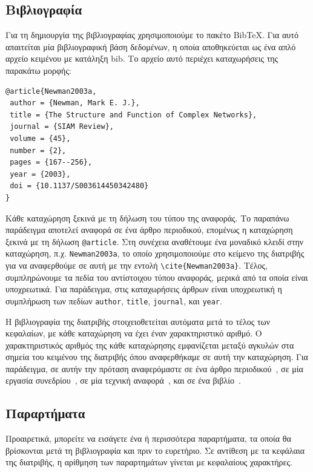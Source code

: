 \subsection{Βιβλιογραφία}
\label{subsec:Bibliography}

Για τη δημιουργία της βιβλιογραφίας χρησιμοποιούμε το πακέτο BibTeX.
Για αυτό απαιτείται μία βιβλιογραφική βάση δεδομένων, η οποία αποθηκεύεται ως ένα απλό αρχείο κειμένου με κατάληξη bib.
Το αρχείο αυτό περιέχει καταχωρήσεις της παρακάτω μορφής:

\begin{verbatim}
@article{Newman2003a,
 author = {Newman, Mark E. J.},
 title = {The Structure and Function of Complex Networks},
 journal = {SIAM Review},
 volume = {45},
 number = {2},
 pages = {167--256},
 year = {2003},
 doi = {10.1137/S003614450342480}
}
\end{verbatim}

Κάθε καταχώρηση ξεκινά με τη δήλωση του τύπου της αναφοράς.
Το παραπάνω παράδειγμα αποτελεί αναφορά σε ένα άρθρο περιοδικού, επομένως η καταχώρηση ξεκινά με τη δήλωση \verb|@article|.
Στη συνέχεια αναθέτουμε ένα μοναδικό κλειδί στην καταχώρηση, π.χ. \verb|Newman2003a|, το οποίο χρησιμοποιούμε στο κείμενο της διατριβής για να αναφερθούμε σε αυτή με την εντολή \verb|\cite{Newman2003a}|.
Τέλος, συμπληρώνουμε τα πεδία του αντίστοιχου τύπου αναφοράς, μερικά από τα οποία είναι υποχρεωτικά.
Για παράδειγμα, στις καταχωρήσεις άρθρων είναι υποχρεωτική η συμπλήρωση των πεδίων \verb|author|, \verb|title|, \verb|journal|, και \verb|year|.

Η βιβλιογραφία της διατριβής στοιχειοθετείται αυτόματα μετά το τέλος των κεφαλαίων, με κάθε καταχώρηση να έχει έναν χαρακτηριστικό αριθμό.
Ο χαρακτηριστικός αριθμός της κάθε καταχώρησης εμφανίζεται μεταξύ αγκυλών στα σημεία του κειμένου της διατριβής όπου αναφερθήκαμε σε αυτή την καταχώρηση.
Για παράδειγμα, σε αυτήν την πρόταση αναφερόμαστε σε ένα άρθρο περιοδικού~\cite{Newman2003a}, σε μία εργασία συνεδρίου~\cite{DeCandia2007a}, σε μία τεχνική αναφορά~\cite{Jain1984a}, και σε ένα βιβλίο~\cite{Golumbic2004a}.

\subsection{Παραρτήματα}
\label{subsec:Appendices}

Προαιρετικά, μπορείτε να εισάγετε ένα ή περισσότερα παραρτήματα, τα οποία θα βρίσκονται μετά τη βιβλιογραφία και πριν το ευρετήριο.
Σε αντίθεση με τα κεφάλαια της διατριβής, η αρίθμηση των παραρτημάτων γίνεται με κεφαλαίους χαρακτήρες.


